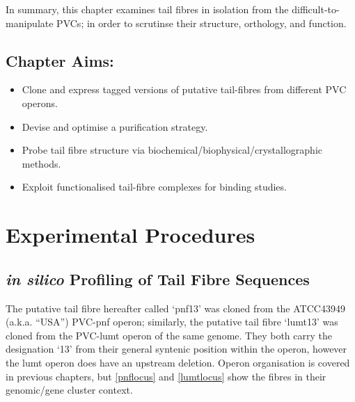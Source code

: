 In summary, this chapter examines tail fibres in isolation from the difficult-to-manipulate PVCs; in order to scrutinse their structure, orthology, and function.

\subsection*{Chapter Aims:}
\begin{itemize}
	\item Clone and express tagged versions of putative tail-fibres from different PVC operons.
	\item Devise and optimise a purification strategy.
	\item Probe tail fibre structure via biochemical/biophysical/crystallographic methods.
	\item Exploit functionalised tail-fibre complexes for binding studies.
\end{itemize}
\clearpage

\section{Experimental Procedures}

\subsection{\emph{in silico} Profiling of Tail Fibre Sequences}
The putative tail fibre hereafter called `pnf13' was cloned from the \Pasy{} ATCC43949 (a.k.a. ``USA'') PVC-pnf operon; similarly, the putative tail fibre `lumt13' was cloned from the PVC-lumt operon of the same genome. They both carry the designation `13' from their general syntenic position within the operon, however the lumt operon does have an upstream deletion. Operon organisation is covered in previous chapters, but \vref{pnflocus} and \vref{lumtlocus} show the fibres in their genomic/gene cluster context.


